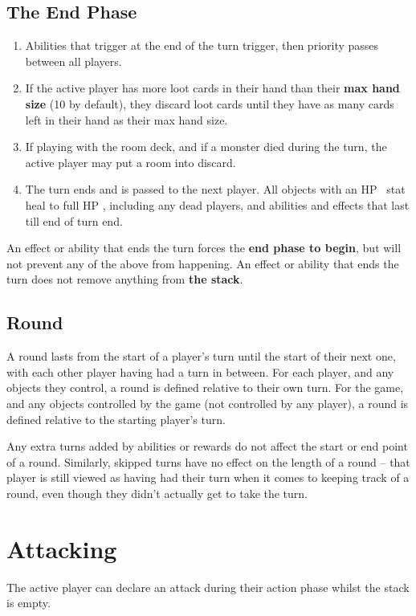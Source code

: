 \documentclass[
  fontsize=10pt,
  paper=a5,
  version=last,
  chapterprefix=true,
  bindingoffset=5mm,
  ]{scrbook}
\newcommand*{\inlineicon}[1]{%
    \raisebox{-.3\baselineskip}{%
        \smash{%
            \texttt{[image: \#1]}%
        }%
    }%
}
\newcommand{\heart}{\inlineicon{./assets/ms-heart.png}}
\begin{document}
    \section{The End Phase}
    \begin{enumerate}
        \item Abilities that trigger at the end of the turn trigger, then priority passes between all players.
        \item If the active player has more loot cards in their hand than their \textbf{max hand size} (10 by default), they discard loot cards until they have as many cards left in their hand as their max hand size.
        \item If playing with the room deck, and if a monster died during the turn, the active player may put a room into discard.
        \item The turn ends and is passed to the next player. All objects with an HP\heart\ stat heal to full HP\heart, including any dead players, and abilities and effects that last till end of turn end.
    \end{enumerate}
    An effect or ability that ends the turn forces the \textbf{end phase to begin}, but will not prevent any of the above from happening. An effect or ability that ends the turn does not remove anything from \textbf{the stack}.

    \section{Round}
    A round lasts from the start of a player’s turn until the start of their next one, with each other player having had a turn in between. For each player, and any objects they control, a round is defined relative to their own turn. For the game, and any objects controlled by the game (not controlled by any player), a round is defined relative to the starting player’s turn.

    Any extra turns added by abilities or rewards do not affect the start or end point of a round. Similarly, skipped turns have no effect on the length of a round – that player is still viewed as having had their turn when it comes to keeping track of a round, even though they didn’t actually get to take the turn.

    \chapter{Attacking}
    \label{attacking}
    The active player can declare an attack during their action phase whilst the stack is empty.
\end{document}
